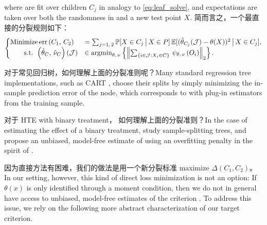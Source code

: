 \documentclass[aos]{imsart}
\theoremstyle{plain}
\theoremstyle{definition}
\theoremstyle{remark}
\begin{document}
\begin{CJK}{UTF8}{gbsn}
where  are fit over children $C_j$ in analogy to \eqref{eq:leaf_solve},
and expectations are taken over both the randomness in  and a
new test point $X$. 简而言之，一个最直接的分裂规则如下：
\begin{equation*}
    \begin{cases}
    \text{Minimize}  \err\p{C_1, \, C_2} &= \sum_{j = 1, \, 2}\mathbb{P}[X \in C_j \cond X \in P] \, \mathbb{E}[(\htheta_{C_j}(\mathcal{J}) - \theta(X))^2 \cond X \in C_j], \\
    \qquad \text{s.t. }   \p{\htheta_{C}, \, \hnu_{C}}(\mathcal{J}) &\in \argmin_{\theta, \, \nu} \cb{\Norm{\sum_{\cb{i\in\mathcal{J} : X_i \in C}} \, \psi_{\theta, \, \nu}\p{O_i}}_2}.
    \end{cases}
\end{equation*}

对于常见回归树，如何理解上面的分裂准则呢？Many standard regression tree implementations, such as CART \citep{breiman1984classification}, choose their splits by simply minimizing the in-sample prediction error of the node, which corresponds to  with plug-in estimators from the training sample.




对于 HTE with binary treatment， 如何理解上面的分裂准则？In the case of estimating the effect of a binary treatment, \citet{athey2016recursive} study sample-splitting trees, and propose an unbiased, model-free estimate of   using
an overfitting penalty in the spirit of \citet{mallows1973some}.


因为直接方法有困难，我们的做法是用一个新分裂标准  maximize $\Delta(C_1, C_2)$。 In our setting, however, this kind of direct loss minimization is not an option: If $\theta(x)$ is only
identified through a moment condition, then we do not in general have access to unbiased, model-free estimates of the criterion  . To address this issue, we rely on the following more abstract characterization of our target criterion. 


\end{CJK}
\end{document}
